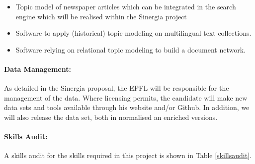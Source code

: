 \begin{itemize}
	\item Topic model of newspaper articles which can be integrated in the search engine which will be realised within the Sinergia project
	\item Software to apply (historical) topic modeling on multilingual text collections.
	\item Software relying on relational topic modeling to build a document network.
\end{itemize}

\paragraph{Data Management:}
As detailed in the Sinergia proposal, the EPFL will be responsible for the management of the data. Where licensing permits, the candidate will make new data sets and tools available through his website and/or Github. In addition, we will also release the data set, both in normalised an enriched versions.

\paragraph*{Skills Audit:}
A skills audit for the skills required in this project is shown in Table \ref{skillsaudit}.

